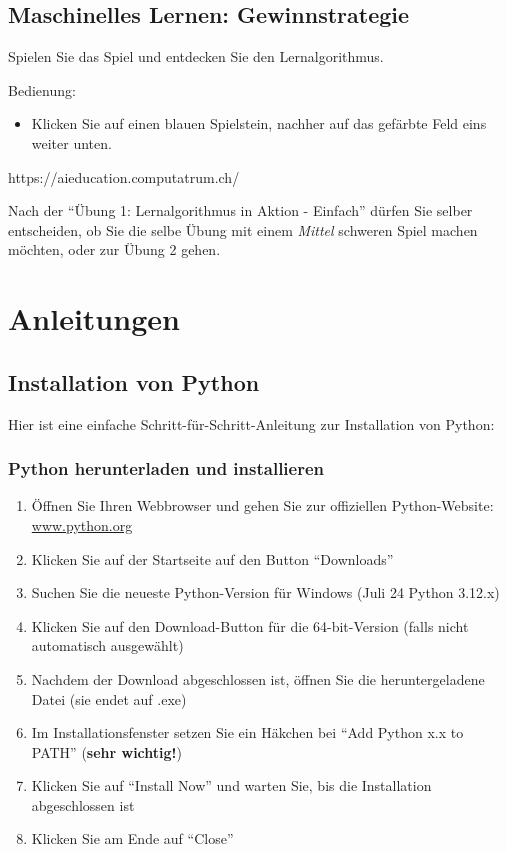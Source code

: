 \documentclass[
  nswissgerman,
  a4paper,
  DIV=11,
  numbers=noendperiod,
  ngerman]{scrreprt}
\providecommand{\tightlist}{%
  \setlength{\itemsep}{0pt}\setlength{\parskip}{0pt}}
\begin{document}
\chapter{Maschinelles Lernen:
Gewinnstrategie}\label{maschinelles-lernen-gewinnstrategie}

Spielen Sie das Spiel und entdecken Sie den Lernalgorithmus.

Bedienung:

\begin{itemize}
\tightlist
\item
  Klicken Sie auf einen blauen Spielstein, nachher auf das gefärbte Feld
  eins weiter unten.
\end{itemize}

https://aieducation.computatrum.ch/

Nach der ``Übung 1: Lernalgorithmus in Aktion - Einfach'' dürfen Sie
selber entscheiden, ob Sie die selbe Übung mit einem \emph{Mittel}
schweren Spiel machen möchten, oder zur Übung 2 gehen.

\part{Anleitungen}

\chapter{Installation von Python}\label{installation-von-python}

Hier ist eine einfache Schritt-für-Schritt-Anleitung zur Installation
von Python:

\section{Python herunterladen und
installieren}\label{python-herunterladen-und-installieren}

\begin{enumerate}
\def\labelenumi{\arabic{enumi}.}
\item
  Öffnen Sie Ihren Webbrowser und gehen Sie zur offiziellen
  Python-Website: \url{www.python.org}
\item
  Klicken Sie auf der Startseite auf den Button ``Downloads''
\item
  Suchen Sie die neueste Python-Version für Windows (Juli 24 Python
  3.12.x)
\item
  Klicken Sie auf den Download-Button für die 64-bit-Version (falls
  nicht automatisch ausgewählt)
\item
  Nachdem der Download abgeschlossen ist, öffnen Sie die
  heruntergeladene Datei (sie endet auf .exe)
\item
  Im Installationsfenster setzen Sie ein Häkchen bei ``Add Python x.x to
  PATH'' (\textbf{sehr wichtig!})
\item
  Klicken Sie auf ``Install Now'' und warten Sie, bis die Installation
  abgeschlossen ist
\item
  Klicken Sie am Ende auf ``Close''
\end{enumerate}
\end{document}
